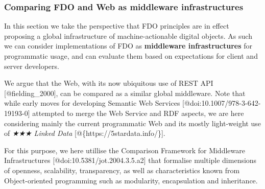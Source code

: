 \hypertarget{sec:middleware}{%
\subsubsection{Comparing FDO and Web as middleware
infrastructures}\label{sec:middleware}}

In this section we take the perspective that FDO principles are in
effect proposing a global infrastructure of machine-actionable digital
objects. As such we can consider implementations of FDO as
\textbf{middleware infrastructures} for programmatic usage, and can
evaluate them based on expectations for client and server developers.

We argue that the Web, with its now ubiquitous use of REST API
{[}@fielding\_2000{]}, can be compared as a similar global middleware.
Note that while early moves for developing Semantic Web Services
{[}@doi:10.1007/978-3-642-19193-0{]} attempted to merge the Web Service
and RDF aspects, we are here considering mainly the current programmatic
Web and its mostly light-weight use of \emph{★★★ Linked Data}
{[}@\{https://5stardata.info/\}{]}.

For this purpose, we here utillise the Comparison Framework for
Middleware Infrastructures {[}@doi:10.5381/jot.2004.3.5.a2{]} that
formalise multiple dimensions of openness, scalability, transparency, as
well as characteristics known from Object-oriented programming such as
modularity, encapsulation and inheritance.

